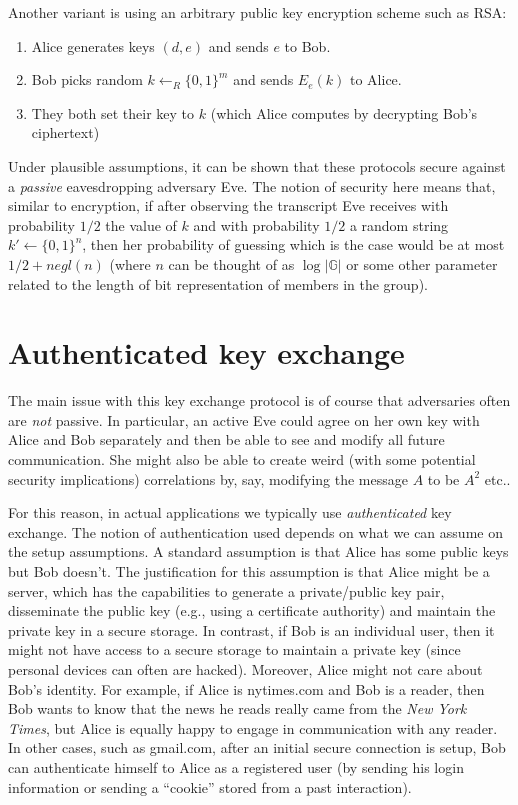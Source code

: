 Another variant is using an arbitrary public key encryption scheme such
as RSA:

\begin{enumerate}
\def\labelenumi{\arabic{enumi}.}
\item
  Alice generates keys \((d,e)\) and sends \(e\) to Bob.
\item
  Bob picks random \(k \leftarrow_R\{0,1\}^m\) and sends \(E_e(k)\) to
  Alice.
\item
  They both set their key to \(k\) (which Alice computes by decrypting
  Bob's ciphertext)
\end{enumerate}

Under plausible assumptions, it can be shown that these protocols secure
against a \emph{passive} eavesdropping adversary Eve. The notion of
security here means that, similar to encryption, if after observing the
transcript Eve receives with probability \(1/2\) the value of \(k\) and
with probability \(1/2\) a random string \(k'\gets\{0,1\}^n\), then her
probability of guessing which is the case would be at most
\(1/2+negl(n)\) (where \(n\) can be thought of as \(\log |\mathbb{G}|\)
or some other parameter related to the length of bit representation of
members in the group).

\section{Authenticated key exchange}\label{12-Authenticated-key-exch}

The main issue with this key exchange protocol is of course that
adversaries often are \emph{not} passive. In particular, an active Eve
could agree on her own key with Alice and Bob separately and then be
able to see and modify all future communication. She might also be able
to create weird (with some potential security implications) correlations
by, say, modifying the message \(A\) to be \(A^2\) etc..

For this reason, in actual applications we typically use
\emph{authenticated} key exchange. The notion of authentication used
depends on what we can assume on the setup assumptions. A standard
assumption is that Alice has some public keys but Bob doesn't. The
justification for this assumption is that Alice might be a server, which
has the capabilities to generate a private/public key pair, disseminate
the public key (e.g., using a certificate authority) and maintain the
private key in a secure storage. In contrast, if Bob is an individual
user, then it might not have access to a secure storage to maintain a
private key (since personal devices can often are hacked). Moreover,
Alice might not care about Bob's identity. For example, if Alice is
nytimes.com and Bob is a reader, then Bob wants to know that the news he
reads really came from the \emph{New York Times}, but Alice is equally
happy to engage in communication with any reader. In other cases, such
as gmail.com, after an initial secure connection is setup, Bob can
authenticate himself to Alice as a registered user (by sending his login
information or sending a ``cookie'' stored from a past interaction).

